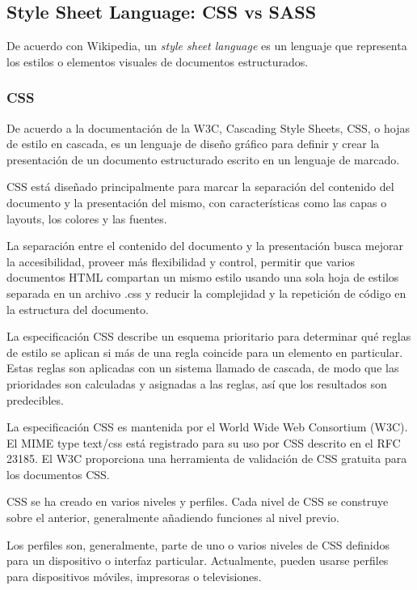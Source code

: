 \subsection{Style Sheet Language: CSS vs SASS}
De acuerdo con Wikipedia\cite{wikipedia_contributors_style_2020}, un \textit{style sheet language} es un lenguaje que representa los estilos o elementos visuales de documentos estructurados.

\subsubsection*{CSS}
De acuerdo a la documentación de la W3C\cite{noauthor_what_nodate}, Cascading Style Sheets, CSS, o hojas de estilo en cascada, es un lenguaje de diseño gráfico para definir y crear la presentación de un documento estructurado escrito en un lenguaje de marcado.


CSS está diseñado principalmente para marcar la separación del contenido del documento y la presentación del mismo, con características como las capas o layouts, los colores y las fuentes.


La separación entre el contenido del documento y la presentación busca mejorar la accesibilidad, proveer más flexibilidad y control, permitir que varios documentos HTML compartan un mismo estilo usando una sola hoja de estilos separada en un archivo .css y reducir la complejidad y la repetición de código en la estructura del documento.


La especificación CSS describe un esquema prioritario para determinar qué reglas de estilo se aplican si más de una regla coincide para un elemento en particular. Estas reglas son aplicadas con un sistema llamado de cascada, de modo que las prioridades son calculadas y asignadas a las reglas, así que los resultados son predecibles.


La especificación CSS es mantenida por el World Wide Web Consortium (W3C). El MIME type text/css está registrado para su uso por CSS descrito en el RFC 23185​. El W3C proporciona una herramienta de validación de CSS gratuita para los documentos CSS.



CSS se ha creado en varios niveles y perfiles. Cada nivel de CSS se construye sobre el anterior, generalmente añadiendo funciones al nivel previo.


Los perfiles son, generalmente, parte de uno o varios niveles de CSS definidos para un dispositivo o interfaz particular. Actualmente, pueden usarse perfiles para dispositivos móviles, impresoras o televisiones.


